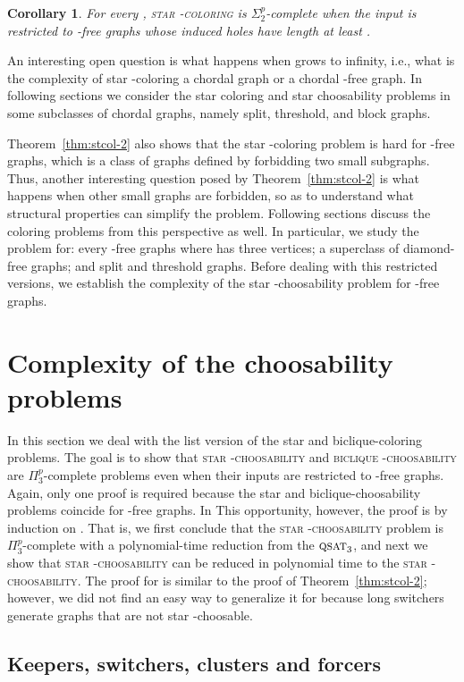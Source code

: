 \documentclass[a4paper, 11pt, oneside]{article}
\newtheorem{corollary}[theorem]{Corollary}
\newcommand{\stcol}[1]{\textsc{star -coloring}}
\newcommand{\stchose}[1]{\textsc{star -choosability}}
\newcommand{\bcchose}[1]{\textsc{biclique -choosability}}
\newcommand{\stp}{\ensuremath{\Sigma^p_2}\xspace}
\newcommand{\ptp}{\ensuremath{\Pi^p_3}\xspace}
\newcommand{\qsat}[1]{\ensuremath{\textsc{qsat}_{#1}}}
\begin{document}
\begin{corollary}
 For every , \stcol{k} is \stp-complete when the input is restricted to -free graphs whose induced holes have length at least .
\end{corollary}

An interesting open question is what happens when  grows to infinity, i.e., what is the complexity of star -coloring a chordal graph or a chordal -free graph.  In following sections we consider the star coloring and star choosability problems in some subclasses of chordal graphs, namely split, threshold, and block graphs.

Theorem~\ref{thm:stcol-2} also shows that the star -coloring problem is hard for -free graphs, which is a class of graphs defined by forbidding two small subgraphs.  Thus, another interesting question posed by Theorem~\ref{thm:stcol-2} is what happens when other small graphs are forbidden, so as to understand what structural properties can simplify the problem.  Following sections discuss the coloring problems from this perspective as well.  In particular, we study the problem for: every -free graphs where  has three vertices; a superclass of diamond-free graphs; and split and threshold graphs.  Before dealing with this restricted versions, we establish the complexity of the star -choosability problem for -free graphs.

\section{Complexity of the choosability problems}
\label{sec:choosability}
 
In this section we deal with the list version of the star and biclique-coloring problems.  The goal is to show that \stchose{k} and \bcchose{k} are \ptp-complete problems even when their inputs are restricted to -free graphs.  Again, only one proof is required because the star and biclique-choosability problems coincide for -free graphs.  In This opportunity, however, the proof is by induction on .  That is, we first conclude that the \stchose{2} problem is \ptp-complete with a polynomial-time reduction from the \qsat{3}, and next we show that \stchose{k} can be reduced in polynomial time to the \stchose{(k+1)}.  The proof for  is similar to the proof of Theorem~\ref{thm:stcol-2}; however, we did not find an easy way to generalize it for  because long switchers generate graphs that are not star -choosable.

\subsection{Keepers, switchers, clusters and forcers}
\end{document}
